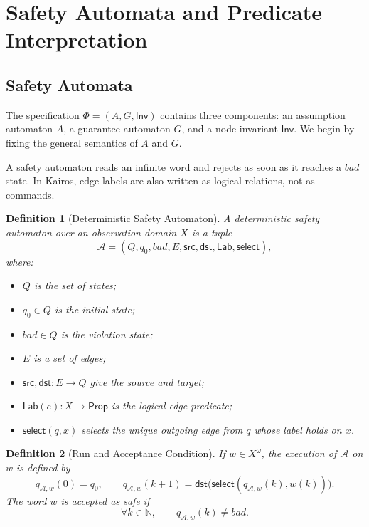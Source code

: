 \documentclass[11pt,a4paper]{article}
\newtheorem{definition}{Definition}[section]
\newcommand{\Nat}{\mathbb{N}}
\newcommand{\Stream}[1]{#1^\omega}
\newcommand{\UserInv}{\mathsf{Inv}}
\begin{document}
\section{Safety Automata and Predicate Interpretation}

\subsection{Safety Automata}

The specification \(\Phi=(A,G,\UserInv)\) contains three components: an
assumption automaton \(A\), a guarantee automaton \(G\), and a node invariant
\(\UserInv\). We begin by fixing the general semantics of \(A\) and \(G\).

A safety automaton reads an infinite word and rejects as soon as it reaches a
\(\mathit{bad}\) state. In Kairos, edge labels are also written as logical
relations, not as commands.

\begin{definition}[Deterministic Safety Automaton]
A deterministic safety automaton over an observation domain \(X\) is a
tuple
\[
\mathcal{A} = (Q,q_0,bad,E,\mathsf{src},\mathsf{dst},\mathsf{Lab},\mathsf{select}),
\]
where:
\begin{itemize}[leftmargin=1.4em]
\item \(Q\) is the set of states;
\item \(q_0 \in Q\) is the initial state;
\item \(bad \in Q\) is the violation state;
\item \(E\) is a set of edges;
\item \(\mathsf{src},\mathsf{dst} : E \to Q\) give the source and target;
\item \(\mathsf{Lab}(e) : X \to \mathsf{Prop}\) is the logical edge predicate;
\item \(\mathsf{select}(q,x)\) selects the unique outgoing edge from \(q\)
  whose label holds on \(x\).
\end{itemize}
\end{definition}

\begin{definition}[Run and Acceptance Condition]
If \(w \in \Stream{X}\), the execution of \(\mathcal{A}\) on \(w\) is defined by
\[
q_{\mathcal{A},w}(0)=q_0,
\qquad
q_{\mathcal{A},w}(k+1)
=
\mathsf{dst}\bigl(\mathsf{select}(q_{\mathcal{A},w}(k),w(k))\bigr).
\]
The word \(w\) is accepted as safe if
\[
\forall k \in \Nat,\qquad q_{\mathcal{A},w}(k) \neq bad.
\]
\end{definition}
\end{document}
